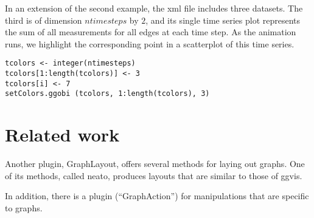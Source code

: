 \documentclass[11pt]{article}
\begin{document}
In an extension of the second example, the xml file includes three
datasets.  The third is of dimension $ntimesteps$ by $2$, and its
single time series plot represents the sum of all measurements
for all edges at each time step.  As the animation runs,
we highlight the corresponding point in a scatterplot of this time series.

\begin{verbatim}
tcolors <- integer(ntimesteps)
tcolors[1:length(tcolors)] <- 3
tcolors[i] <- 7
setColors.ggobi (tcolors, 1:length(tcolors), 3)
\end{verbatim}

\section{Related work}

Another plugin, GraphLayout, offers several methods for laying
out graphs.  One of its methods, called neato, produces layouts
that are similar to those of ggvis.

In addition, there is a plugin (``GraphAction'') for manipulations
that are specific to graphs.


\end{document}
